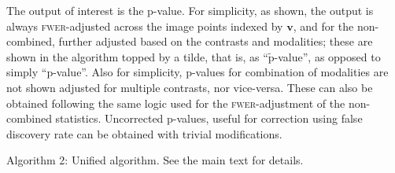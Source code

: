 The output of interest is the p-value. For simplicity, as shown, the output is always \textsc{fwer}-adjusted across the image points indexed by $\mathbf{v}$, and for the non-combined, further adjusted based on the contrasts and modalities; these are shown in the algorithm topped by a tilde, that is, as ``$\tilde{\text{p}}$-value'', as opposed to simply ``p-value''. Also for simplicity, p-values for combination of modalities are not shown adjusted for multiple contrasts, nor vice-versa. These can also be obtained following the same logic used for the \textsc{fwer}-adjustment of the non-combined statistics. Uncorrected p-values, useful for correction using false discovery rate \citep[\textsc{fdr},][]{Benjamini1995} can be obtained with trivial modifications. 

\vspace{4mm}
\singlespacing
\noindent Algorithm 2: Unified algorithm. See the main text for details.\\
\HRule
\vspace{1mm}
\algrenewcommand\algorithmicindent{1em}
